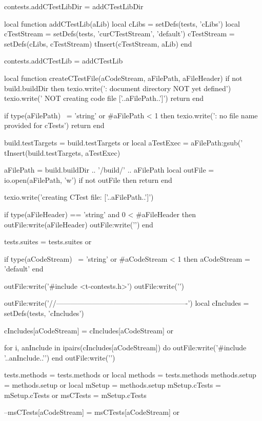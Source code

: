 contests.addCTestLibDir = addCTestLibDir

local function addCTestLib(aLib)
  local cLibs          = setDefs(tests, 'cLibs')
  local cTestStream    = setDefs(tests, 'curCTestStream', 'default')
  cTestStream          = setDefs(cLibs, cTestStream)
  tInsert(cTestStream, aLib)
end

contests.addCTestLib = addCTestLib

local function createCTestFile(aCodeStream, aFilePath, aFileHeader)
  if not build.buildDir then
    texio.write('\nERROR: document directory NOT yet defined\n')
    texio.write('       NOT creating code file ['..aFilePath..']\n\n')
    return
  end

  if type(aFilePath) ~= 'string'
    or #aFilePath < 1 then
    texio.write('\nERROR: no file name provided for cTests\n\n')
    return
  end

  build.testTargets = build.testTargets or { }
  local aTestExec = aFilePath:gsub('%
  tInsert(build.testTargets, aTestExec)

  aFilePath = build.buildDir .. '/build/' .. aFilePath
  local outFile = io.open(aFilePath, 'w')
  if not outFile then
    return
  end

  texio.write('creating CTest file: ['..aFilePath..']\n')

  if type(aFileHeader) == 'string'
    and 0 < #aFileHeader then
    outFile:write(aFileHeader)
    outFile:write('\n\n')
  end

  tests.suites = tests.suites or { }

  if type(aCodeStream) ~= 'string'
    or #aCodeStream < 1 then
    aCodeStream = 'default'
  end

  outFile:write('#include <t-contests.h>\n')
  outFile:write('\n\n')

  outFile:write('//-------------------------------------------------------\n')
  local cIncludes = setDefs(tests, 'cIncludes')

  cIncludes[aCodeStream] = cIncludes[aCodeStream] or { }

  for i, anInclude in ipairs(cIncludes[aCodeStream]) do
    outFile:write('#include '..anInclude..'\n')
  end
  outFile:write('\n\n')

  tests.methods = tests.methods or { }
  local methods = tests.methods
  methods.setup = methods.setup or { }
  local mSetup  = methods.setup
  mSetup.cTests = mSetup.cTests or { }
  msCTests      = mSetup.cTests

  --msCTests[aCodeStream] = msCTests[aCodeStream] or { }

